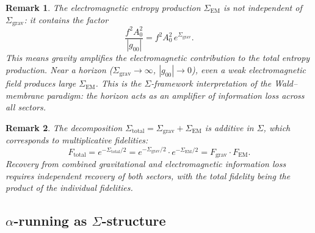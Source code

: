 \documentclass[letterpaper,twocolumn,superscriptaddress,longbibliography]{revtex4-2}
\newtheorem*{remark}{Remark}
\newcommand{\abs}[1]{\left|#1\right|}
\newcommand{\Sgrav}{\Sigma_{\mathrm{grav}}}
\newcommand{\SEM}{\Sigma_{\mathrm{EM}}}
\newcommand{\Stot}{\Sigma_{\mathrm{total}}}
\begin{document}
\begin{remark}
The electromagnetic entropy production $\SEM$ is
\emph{not} independent of $\Sgrav$: it contains the factor
\begin{equation}
  \frac{f^2 A_0^2}{\abs{g_{00}}}
  = f^2 A_0^2\,e^{\Sgrav}.
  \label{eq:SEM_coupling}
\end{equation}
This means gravity amplifies the electromagnetic
contribution to the total entropy production.  Near a
horizon ($\Sgrav \to \infty$, $\abs{g_{00}} \to 0$),
even a weak electromagnetic field produces large $\SEM$.
This is the $\Sigma$-framework interpretation of the
Wald--membrane paradigm: the horizon acts as an amplifier
of information loss across all sectors.
\end{remark}

\begin{remark}
The decomposition $\Stot = \Sgrav + \SEM$ is
\emph{additive in $\Sigma$}, which corresponds to
\emph{multiplicative} fidelities:
\begin{equation}
  F_{\mathrm{total}} = e^{-\Stot/2}
  = e^{-\Sgrav/2}\cdot e^{-\SEM/2}
  = F_{\mathrm{grav}}\cdot F_{\mathrm{EM}}.
  \label{eq:F_multiplicative}
\end{equation}
Recovery from combined gravitational and electromagnetic
information loss requires independent recovery of both
sectors, with the total fidelity being the product of
the individual fidelities.
\end{remark}

\subsection{$\alpha$-running as $\Sigma$-structure}
\label{sec:alpha_running}
\end{document}

